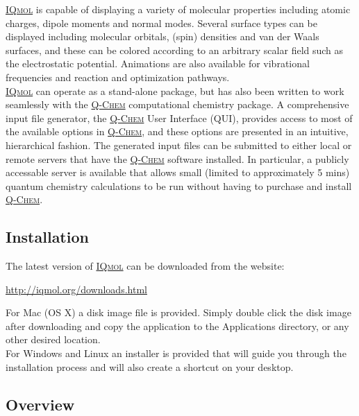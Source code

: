 \documentclass[a4paper,12pt]{article}
\newcommand{\qchem}{\href{http://q-chem.com}{{\scshape Q-Chem}}}
\newcommand{\iqmol}{\href{http://iqmol.org}{{\scshape IQmol}}}
\begin{document}
\iqmol{} is capable of displaying a variety of molecular properties including
atomic charges, dipole moments and normal modes.  Several surface types can be
displayed including molecular orbitals, (spin) densities and van der Waals
surfaces, and these can be colored according to an arbitrary scalar field such
as the electrostatic potential.  Animations are also available for vibrational
frequencies and reaction and optimization pathways. \\

\iqmol{} can operate as a stand-alone package, but has also been written to
work seamlessly with the \qchem{} computational chemistry package.  A
comprehensive input file generator, the \qchem{} User Interface (QUI), provides
access to most of the available options in \qchem{}, and these options are
presented in an intuitive, hierarchical fashion.   The generated input files can
be submitted to either local or remote servers that have the \qchem{} software
installed.  In particular, a publicly accessable server is available that
allows small (limited to approximately 5 mins) quantum chemistry calculations to
be run without having to purchase and install \qchem{}.



\subsection{Installation}

The latest version of \iqmol{} can be downloaded from the website:
\begin{center}
\url{http://iqmol.org/downloads.html}
\end{center}

For Mac (OS X) a disk image file is provided.  Simply double click the disk
image after downloading and copy the application to the Applications directory,
or any other desired location. \\

For Windows and Linux an installer is provided that will guide you through the
installation process and will also create a shortcut on your desktop.


\newpage
\subsection{Overview}
\end{document}
